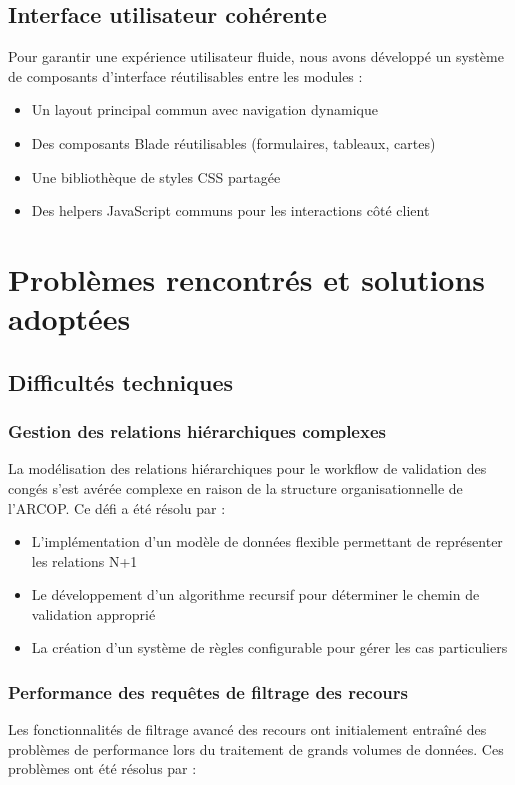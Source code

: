 \subsection{Interface utilisateur cohérente}
Pour garantir une expérience utilisateur fluide, nous avons développé un système de composants d'interface réutilisables entre les modules :

\begin{itemize}
    \item Un layout principal commun avec navigation dynamique
    \item Des composants Blade réutilisables (formulaires, tableaux, cartes)
    \item Une bibliothèque de styles CSS partagée
    \item Des helpers JavaScript communs pour les interactions côté client
\end{itemize}

\section{Problèmes rencontrés et solutions adoptées}

\subsection{Difficultés techniques}

\subsubsection{Gestion des relations hiérarchiques complexes}
La modélisation des relations hiérarchiques pour le workflow de validation des congés s'est avérée complexe en raison de la structure organisationnelle de l'ARCOP. Ce défi a été résolu par :

\begin{itemize}
    \item L'implémentation d'un modèle de données flexible permettant de représenter les relations N+1
    \item Le développement d'un algorithme recursif pour déterminer le chemin de validation approprié
    \item La création d'un système de règles configurable pour gérer les cas particuliers
\end{itemize}

\subsubsection{Performance des requêtes de filtrage des recours}
Les fonctionnalités de filtrage avancé des recours ont initialement entraîné des problèmes de performance lors du traitement de grands volumes de données. Ces problèmes ont été résolus par :

